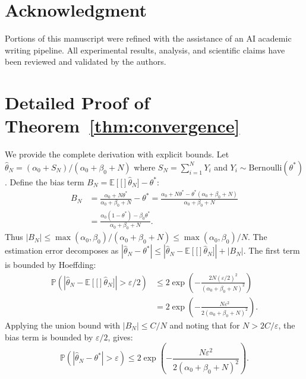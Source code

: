 \documentclass[journal]{IEEEtran}
\theoremstyle{plain}
\newcommand{\Prob}{\mathbb{P}}
\newcommand{\E}[1]{\mathbb{E}\left[#1\right]}
\begin{document}
\section*{Acknowledgment}
Portions of this manuscript were refined with the assistance of an AI academic writing pipeline. All experimental results, analysis, and scientific claims have been reviewed and validated by the authors.

\balance



\appendices
\section{Detailed Proof of Theorem~\ref{thm:convergence}}

We provide the complete derivation with explicit bounds. Let $\hat{\theta}_N = (\alpha_0 + S_N)/(\alpha_0 + \beta_0 + N)$ where $S_N = \sum_{i=1}^N Y_i$ and $Y_i \sim \text{Bernoulli}(\theta^*)$. Define the bias term $B_N = \E[\hat{\theta}_N] - \theta^*$:
\begin{align}
B_N &= \frac{\alpha_0 + N\theta^*}{\alpha_0 + \beta_0 + N} - \theta^*
= \frac{\alpha_0 + N\theta^* - \theta^*(\alpha_0 + \beta_0 + N)}{\alpha_0 + \beta_0 + N} \\
&= \frac{\alpha_0(1 - \theta^*) - \beta_0\theta^*}{\alpha_0 + \beta_0 + N}.
\label{eq:bias_bound}
\end{align}
Thus $|B_N| \leq \max(\alpha_0, \beta_0)/(\alpha_0 + \beta_0 + N) \leq \max(\alpha_0, \beta_0)/N$. The estimation error decomposes as $|\hat{\theta}_N - \theta^*| \leq |\hat{\theta}_N - \E[\hat{\theta}_N]| + |B_N|$. The first term is bounded by Hoeffding:
\begin{align}
\Prob(|\hat{\theta}_N - \E[\hat{\theta}_N]| > \varepsilon/2) &\leq 2\exp\left(-\frac{2N(\varepsilon/2)^2}{(\alpha_0+\beta_0+N)^2}\right) \\
&= 2\exp\left(-\frac{N\varepsilon^2}{2(\alpha_0+\beta_0+N)^2}\right).
\end{align}
Applying the union bound with $|B_N| \leq C/N$ and noting that for $N > 2C/\varepsilon$, the bias term is bounded by $\varepsilon/2$, gives:
\begin{equation}
\Prob(|\hat{\theta}_N - \theta^*| > \varepsilon) \leq 2\exp\left(-\frac{N\varepsilon^2}{2(\alpha_0+\beta_0+N)^2}\right).
\label{eq:final_bound}
\end{equation}
\end{document}
